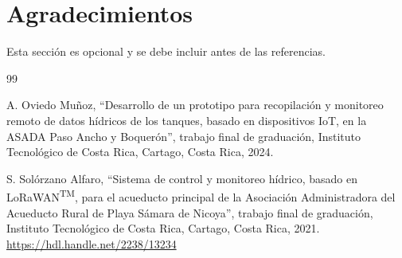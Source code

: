 \documentclass[12pt,letterpaper]{article}
\begin{document}
\section{Agradecimientos}
Esta sección es opcional y se debe incluir antes de las referencias.

\begin{thebibliography}{99}

A. Oviedo Muñoz, ``Desarrollo de un prototipo para recopilación y monitoreo remoto de datos hídricos de los tanques, basado en dispositivos IoT, en la ASADA Paso Ancho y Boquerón'', trabajo final de graduación, Instituto Tecnológico de Costa Rica, Cartago, Costa Rica, 2024.

S. Solórzano Alfaro, ``Sistema de control y monitoreo hídrico, basado en LoRaWAN\textsuperscript{TM}, para el acueducto principal de la Asociación Administradora del Acueducto Rural de Playa Sámara de Nicoya'', trabajo final de graduación, Instituto Tecnológico de Costa Rica, Cartago, Costa Rica, 2021. \url{https://hdl.handle.net/2238/13234}

\end{thebibliography}
\end{document}
